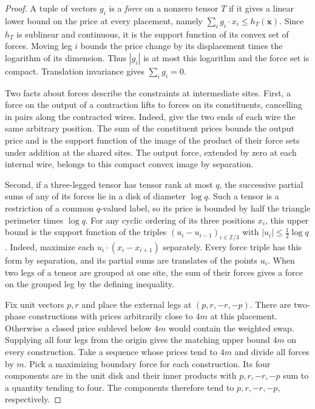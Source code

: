 \begin{proof}
A tuple of vectors $g_i$ is a \emph{force} on a nonzero tensor $T$ if it
gives a linear lower bound on the price at every placement, namely
$\sum_i g_i\cdot x_i\le h_T(\mathbf x)$. Since $h_T$ is sublinear
and continuous, it is the support function of its convex set of
forces. Moving leg $i$ bounds the price change by its displacement
times the logarithm of its dimension. Thus $|g_i|$ is at most this
logarithm and the force set is compact. Translation invariance gives
$\sum_i g_i=0$.

Two facts about forces describe the constraints at intermediate sites.
First, a force on the output of a contraction lifts to forces on
its constituents, cancelling in pairs along the contracted wires.
Indeed, give the two ends of each wire the same arbitrary position.
The sum of the constituent prices bounds the output price and is
the support function of the image of the product of their force sets
under addition at the shared sites. The output force, extended by
zero at each internal wire, belongs to this compact convex image by
separation.

Second, if a three-legged tensor has tensor rank at most $q$, the
successive partial sums of any of its forces lie in a disk of diameter
$\log q$. Such a tensor is a restriction of a common $q$-valued
label, so its price is bounded by half the triangle perimeter times
$\log q$. For any cyclic ordering of its three positions $x_i$, this
upper bound is the support function of the triples
$(u_i-u_{i-1})_{i\in\mathbb Z/3}$ with $|u_i|\le\tfrac12\log q$.
Indeed, maximize each $u_i\cdot(x_i-x_{i+1})$ separately. Every
force triple has this form by separation, and its partial sums are
translates of the points $u_i$. When two legs of a tensor are grouped
at one site, the sum of their forces gives a force on the grouped leg
by the defining inequality.

Fix unit vectors $p,r$ and place the external legs at $(p,r,-r,-p)$.
There are two-phase constructions with prices arbitrarily close to $4m$
at this placement. Otherwise a closed price sublevel below $4m$
would contain the weighted swap. Supplying all four legs from the
origin gives the matching upper bound $4m$ on every construction.
Take a sequence whose prices tend to $4m$ and divide all forces by
$m$. Pick a maximizing boundary force for each construction. Its
four components are in the unit disk and their inner products with
$p,r,-r,-p$ sum to a quantity tending to four. The components
therefore tend to $p,r,-r,-p$, respectively.


\end{proof}
